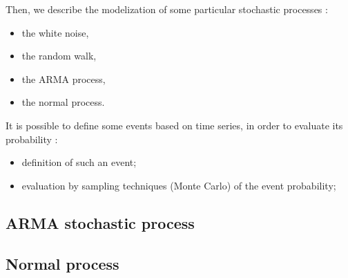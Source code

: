 Then, we describe the modelization of some particular stochastic processes :
\begin{itemize}
  \item the white noise,
  \item the random walk,
  \item the ARMA process, 
  \item the normal process.
\end{itemize}

It is possible to define some events based on time series, in  order to evaluate its probability :
\begin{itemize}
  \item definition of such an event; 
  \item evaluation by sampling techniques (Monte Carlo) of the event probability;
\end{itemize}


\newpage 
\newpage 
\newpage 
\newpage 
\newpage 
\newpage 


\newpage \subsection{ARMA stochastic process}



\newpage 
\newpage 
\newpage 
\newpage 
\newpage 

\newpage \subsection{Normal process}


\newpage 
\newpage 
\newpage 
\newpage 
\newpage 
\newpage 


